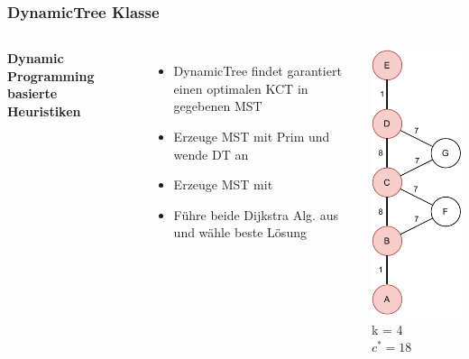 \documentclass[aspectratio=169]{beamer}
\begin{document}
\begin{frame}
	\frametitle{DynamicTree Klasse}
	\begin{columns}[c] %
		
		\textbf{Dynamic Programming basierte Heuristiken}
		\begin{itemize}
			\item DynamicTree findet garantiert einen optimalen KCT in gegebenen MST
			\item Erzeuge MST mit Prim und wende DT an
			\item Erzeuge MST mit 
			\item Führe beide Dijkstra Alg. aus und wähle beste Lösung
		\end{itemize}
		\includegraphics[scale=.6]{path_optimal.pdf}
		k = 4\\
		$c^* = 18$
		
		
	\end{columns}
	\end{frame}
	
\end{document}
